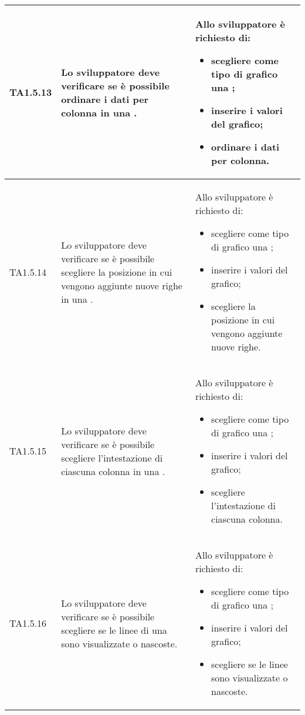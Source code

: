 \begin{longtabu}{| X[0.5] | X | X |}
	TA1.5.13 & Lo sviluppatore deve verificare se è possibile ordinare i dati per colonna in una .

		& Allo sviluppatore è richiesto di:
		\begin{itemize}
			\item scegliere come tipo di grafico una ;
			\item inserire i valori del grafico;
			\item ordinare i dati per colonna.
		\end{itemize}
\\ \hline

	TA1.5.14 & Lo sviluppatore deve verificare se è possibile scegliere la posizione in cui vengono aggiunte nuove righe in una .

		& Allo sviluppatore è richiesto di:
		\begin{itemize}
			\item scegliere come tipo di grafico una ;
			\item inserire i valori del grafico;
			\item scegliere la posizione in cui vengono aggiunte nuove righe.
		\end{itemize}
\\ \hline

	TA1.5.15 & Lo sviluppatore deve verificare se è possibile scegliere l'intestazione di ciascuna colonna in una .

		& Allo sviluppatore è richiesto di:
		\begin{itemize}
			\item scegliere come tipo di grafico una ;
			\item inserire i valori del grafico;
			\item scegliere l'intestazione di ciascuna colonna.
		\end{itemize}
\\ \hline

	TA1.5.16 & Lo sviluppatore deve verificare se è possibile scegliere se le linee di una  sono visualizzate o nascoste.

		& Allo sviluppatore è richiesto di:
		\begin{itemize}
			\item scegliere come tipo di grafico una ;
			\item inserire i valori del grafico;
			\item scegliere se le linee sono visualizzate o nascoste.
		\end{itemize}
\\ \hline


\end{longtabu}
